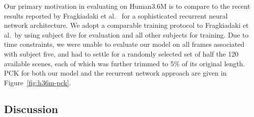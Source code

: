 \documentclass[runningheads]{llncs}
\begin{document}
Our primary motivation in evaluating on Human3.6M is to compare to the recent
results reported by Fragkiadaki et al.~\cite{fragkiadaki2015recurrent} for a
sophisticated recurrent neural network architecture. We adopt a comparable
training protocol to Fragkiadaki et al.\ by using subject five for evaluation and
all other subjects for training. Due to time constraints, we were unable to
evaluate our model on all frames associated with subject five, and had to settle
for a randomly selected set of half the 120 available scenes, each of which was
further trimmed to 5\% of its original length. PCK for both our model and the
recurrent network approach are given in Figure~\ref{fig:h36m-pck}.

\subsection{Discussion}

\end{document}

